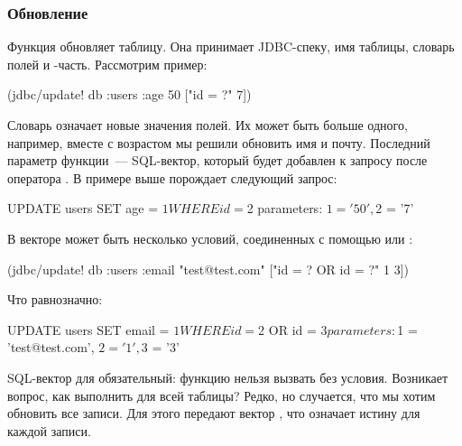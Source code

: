 \subsubsection{Обновление}

Функция  обновляет таблицу. Она принимает JDBC-спеку, имя таблицы, словарь полей и -часть. Рассмотрим пример:

\begin{english}
  \begin{clojure}
(jdbc/update! db :users {:age 50} ["id = ?" 7])
  \end{clojure}
\end{english}

Словарь  означает новые значения полей. Их может быть больше одного, например, вместе с возрастом мы решили обновить имя и почту. Последний параметр функции~--- SQL-вектор, который будет добавлен к запросу после оператора . В примере выше  порождает следующий запрос:

\begin{english}
  \begin{sql}
UPDATE users SET age = $1 WHERE id = $2
parameters: $1 = '50', $2 = '7'
  \end{sql}
\end{english}

В векторе может быть несколько условий, соединенных с помощью  или :

\begin{english}
  \begin{clojure}
(jdbc/update! db :users {:email "test@test.com"} ["id = ? OR id = ?" 1 3])
  \end{clojure}
\end{english}

\noindent
Что равнозначно:

\begin{english}
  \begin{sql}
UPDATE users SET email = $1 WHERE id = $2 OR id = $3
parameters: $1 = 'test@test.com', $2 = '1', $3 = '3'
  \end{sql}
\end{english}

SQL-вектор для  обязательный: функцию нельзя вызвать без условия. Возникает вопрос, как выполнить  для всей таблицы? Редко, но случается, что мы хотим обновить все записи. Для этого передают вектор \code{["true"]}, что означает истину для каждой записи.

